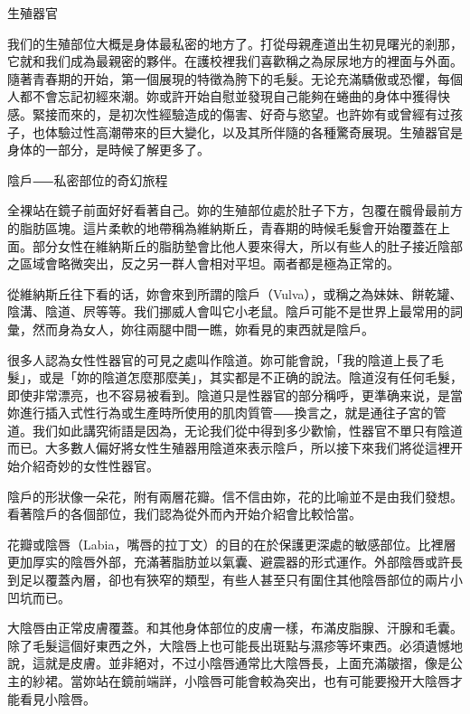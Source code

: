 \documentclass[12pt,UTF8]{ctexbook}
\begin{document}
\mainmatter

生殖器官

我们的生殖部位大概是身体最私密的地方了。打從母親產道出生初見曙光的剎那，它就和我们成為最親密的夥伴。在護校裡我们喜歡稱之為尿尿地方的裡面与外面。隨著青春期的开始，第一個展現的特徵為胯下的毛髮。无论充滿驕傲或恐懼，每個人都不會忘記初經來潮。妳或許开始自慰並發現自己能夠在蜷曲的身体中獲得快感。緊接而來的，是初次性經驗造成的傷害、好奇与慾望。也許妳有或曾經有过孩子，也体驗过性高潮帶來的巨大變化，以及其所伴隨的各種驚奇展現。生殖器官是身体的一部分，是時候了解更多了。





陰戶⸺私密部位的奇幻旅程




全裸站在鏡子前面好好看著自己。妳的生殖部位處於肚子下方，包覆在髖骨最前方的脂肪區塊。這片柔軟的地帶稱為維納斯丘，青春期的時候毛髮會开始覆蓋在上面。部分女性在維納斯丘的脂肪墊會比他人要來得大，所以有些人的肚子接近陰部之區域會略微突出，反之另一群人會相对平坦。兩者都是極為正常的。





從維納斯丘往下看的话，妳會來到所謂的陰戶（Vulva），或稱之為妹妹、餅乾罐、陰溝、陰道、屄等等。我们挪威人會叫它小老鼠。陰戶可能不是世界上最常用的詞彙，然而身為女人，妳往兩腿中間一瞧，妳看見的東西就是陰戶。

很多人認為女性性器官的可見之處叫作陰道。妳可能會說，「我的陰道上長了毛髮」，或是「妳的陰道怎麼那麼美」，其实都是不正确的說法。陰道沒有任何毛髮，即使非常漂亮，也不容易被看到。陰道只是性器官的部分稱呼，更準确来说，是當妳進行插入式性行為或生產時所使用的肌肉質管⸺換言之，就是通往子宮的管道。我们如此講究術語是因為，无论我们從中得到多少歡愉，性器官不單只有陰道而已。大多數人偏好將女性生殖器用陰道來表示陰戶，所以接下來我们將從這裡开始介紹奇妙的女性性器官。

陰戶的形狀像一朵花，附有兩層花瓣。信不信由妳，花的比喻並不是由我们發想。看著陰戶的各個部位，我们認為從外而內开始介紹會比較恰當。





花瓣或陰唇（Labia，嘴唇的拉丁文）的目的在於保護更深處的敏感部位。比裡層更加厚实的陰唇外部，充滿著脂肪並以氣囊、避震器的形式運作。外部陰唇或許長到足以覆蓋內層，卻也有狹窄的類型，有些人甚至只有圍住其他陰唇部位的兩片小凹坑而已。

大陰唇由正常皮膚覆蓋。和其他身体部位的皮膚一樣，布滿皮脂腺、汗腺和毛囊。除了毛髮這個好東西之外，大陰唇上也可能長出斑點与濕疹等坏東西。必須遺憾地說，這就是皮膚。並非絕对，不过小陰唇通常比大陰唇長，上面充滿皺摺，像是公主的紗裙。當妳站在鏡前端詳，小陰唇可能會較為突出，也有可能要撥开大陰唇才能看見小陰唇。
\end{document}
